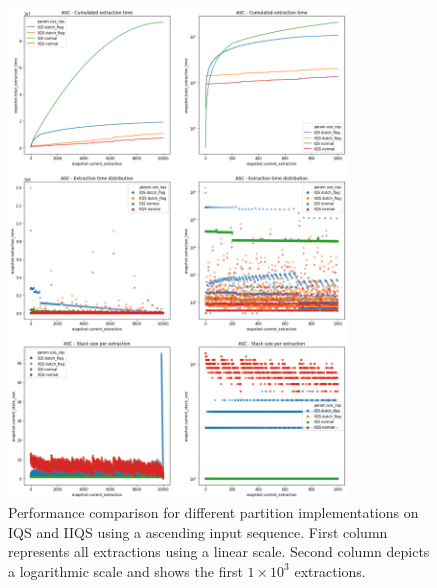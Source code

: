 \begin{figure}[!ht]
    \centering
    \includegraphics[width=0.8\textwidth]{./fragments/04_experimental_execution/images/02_benchmark_02_sort_a_case.png}
    \caption{Performance comparison for different partition implementations on IQS and IIQS using a ascending input sequence. First column represents all extractions using a linear scale. Second column depicts a logarithmic scale and shows the first $1\times10^3$ extractions.}
    \label{FIG:PARTITION_SCHEME_01_ASCENDING}
\end{figure}

